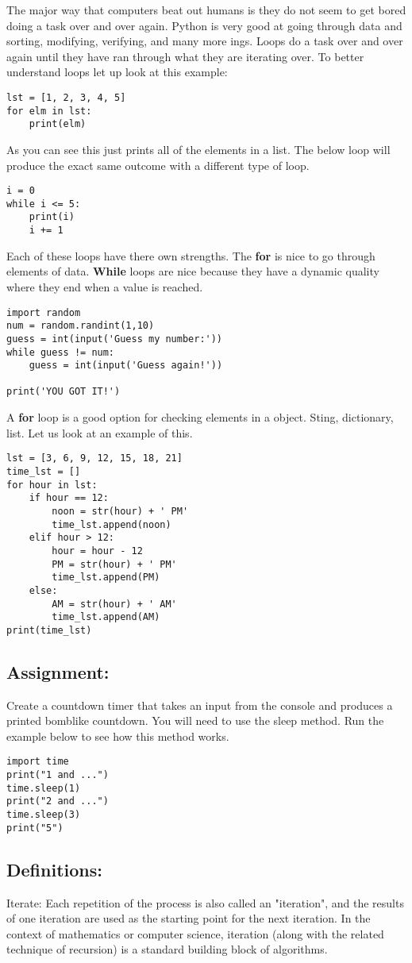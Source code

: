 \documentclass[../main.tex]{subfiles}
\begin{document}
The major way that computers beat out humans is they do not seem to get bored doing a task over and over again. Python is very good at going through data and sorting, modifying, verifying, and many more ings. Loops do a task over and over again until they have ran through what they are iterating over. To better understand loops let up look at this example:
\begin{lstlisting}[caption=For Loop]
lst = [1, 2, 3, 4, 5]
for elm in lst:
    print(elm)
\end{lstlisting}
As you can see this just prints all of the elements in a list. The below loop will produce the exact same outcome with a different type of loop.
\begin{lstlisting}
i = 0
while i <= 5:
    print(i)
    i += 1
\end{lstlisting}
Each of these loops have there own strengths. The \textbf{for} is nice to go through elements of data. \textbf{While} loops are nice because they have a dynamic quality where they end when a value is reached.
\begin{lstlisting}
import random
num = random.randint(1,10)
guess = int(input('Guess my number:'))
while guess != num:
    guess = int(input('Guess again!'))

print('YOU GOT IT!')
\end{lstlisting}
A \textbf{for} loop is a good option for checking elements in a object. Sting, dictionary, list. Let us look at an example of this.
\begin{lstlisting}
lst = [3, 6, 9, 12, 15, 18, 21]
time_lst = []
for hour in lst:
    if hour == 12:
        noon = str(hour) + ' PM'
        time_lst.append(noon)
    elif hour > 12:
        hour = hour - 12
        PM = str(hour) + ' PM'
        time_lst.append(PM)
    else:
        AM = str(hour) + ' AM'
        time_lst.append(AM)
print(time_lst)
\end{lstlisting}
\subsection*{Assignment:}

Create a countdown timer that takes an input from the console and produces a printed bomblike countdown. You will need to use the sleep method. Run the example below to see how this method works.
\begin{lstlisting}
import time
print("1 and ...")
time.sleep(1)
print("2 and ...")
time.sleep(3)
print("5")
\end{lstlisting}
\subsection*{Definitions:}
Iterate: Each repetition of the process is also called an "iteration", and the results of one iteration are used as the starting point for the next iteration. In the context of mathematics or computer science, iteration (along with the
related technique of recursion) is a standard building block of algorithms.

\newpage
\end{document}
